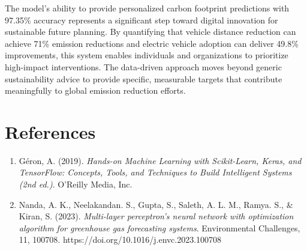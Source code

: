\documentclass[12pt,a4paper]{article}
\begin{document}
The model's ability to provide personalized carbon footprint predictions with 97.35\% accuracy represents a significant step toward digital innovation for sustainable future planning. By quantifying that vehicle distance reduction can achieve 71\% emission reductions and electric vehicle adoption can deliver 49.8\% improvements, this system enables individuals and organizations to prioritize high-impact interventions. The data-driven approach moves beyond generic sustainability advice to provide specific, measurable targets that contribute meaningfully to global emission reduction efforts.

\section{References}

\begin{enumerate}
\item Géron, A. (2019). \textit{Hands-on Machine Learning with Scikit-Learn, Keras, and TensorFlow: Concepts, Tools, and Techniques to Build Intelligent Systems (2nd ed.)}. O’Reilly Media, Inc.
\item Nanda, A. K., Neelakandan. S., Gupta, S., Saleth, A. L. M., Ramya. S., \& Kiran, S. (2023). \textit{Multi-layer perceptron’s neural network with optimization algorithm for greenhouse gas forecasting systems}. Environmental Challenges, 11, 100708. https://doi.org/10.1016/j.envc.2023.100708

\end{enumerate}
\end{document}
